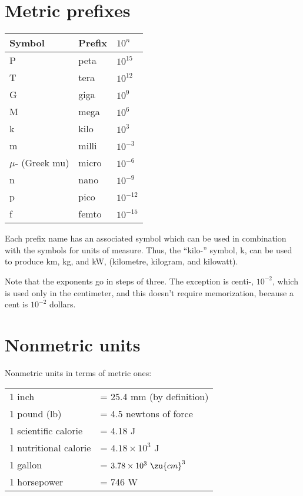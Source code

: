  \chapter{Metric prefixes}\label{metricprefixestable}
 \noindent\begin{tabular}{|l|l|l|}
 \hline

Symbol & Prefix & $10^n$ \\
\hline
P & peta & $10^{15}$ \\
 T & tera & $10^{12}$ \\
 G     & giga                  & $10^9$ \\
 M	& mega			& $10^6$ \\
 k	& kilo			& $10^3$ \\
 m	& milli		& $10^{-3}$ \\
 $\mu$- (Greek mu) & micro	& $10^{-6}$ \\
 n	& nano			& $10^{-9}$ \\
 p	& pico			& $10^{-12}$ \\
 f	& femto		& $10^{-15}$ \\
 \hline
 \end{tabular}

\noindent{}
Each prefix name has an associated symbol which can be used in combination with the symbols for units of measure. Thus, the ``kilo-'' symbol, k, can be used to produce km, kg, and kW, (kilometre, kilogram, and kilowatt).

 \noindent{}Note that the exponents go in steps of three.
 The exception is centi-, $10^{-2}$, which is used only in the centimeter, and this
 doesn't require memorization, because a cent is $10^{-2}$ dollars.

 \chapter{Nonmetric units}\label{nonmetricunits}
 \noindent Nonmetric units in terms of metric ones:\\
 \noindent\begin{tabular}{|l|l|}
 \hline
 1 inch	&= 25.4 mm (by definition)\\
 1 pound (lb)	&= 4.5 newtons of force\\
 1 scientific calorie &= 4.18 J\\
 1 nutritional calorie &= $4.18\times10^3$ J\\
 1 gallon &= $3.78\times10^3\ \zu{cm}^3$\\
 1 horsepower &= 746 W\\
 \hline
 \end{tabular}

